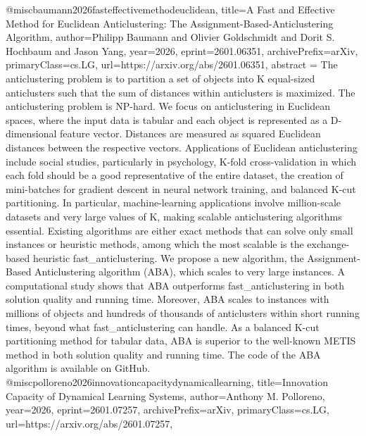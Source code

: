 {}@misc{baumann2026fasteffectivemethodeuclidean,
      title={A Fast and Effective Method for Euclidean Anticlustering: The Assignment-Based-Anticlustering Algorithm}, 
      author={Philipp Baumann and Olivier Goldschmidt and Dorit S. Hochbaum and Jason Yang},
      year={2026},
      eprint={2601.06351},
      archivePrefix={arXiv},
      primaryClass={cs.LG},
      url={https://arxiv.org/abs/2601.06351},
      abstract = {The anticlustering problem is to partition a set of objects into K equal-sized anticlusters such that the sum of distances within anticlusters is maximized. The anticlustering problem is NP-hard. We focus on anticlustering in Euclidean spaces, where the input data is tabular and each object is represented as a D-dimensional feature vector. Distances are measured as squared Euclidean distances between the respective vectors. Applications of Euclidean anticlustering include social studies, particularly in psychology, K-fold cross-validation in which each fold should be a good representative of the entire dataset, the creation of mini-batches for gradient descent in neural network training, and balanced K-cut partitioning. In particular, machine-learning applications involve million-scale datasets and very large values of K, making scalable anticlustering algorithms essential. Existing algorithms are either exact methods that can solve only small instances or heuristic methods, among which the most scalable is the exchange-based heuristic fast_anticlustering. We propose a new algorithm, the Assignment-Based Anticlustering algorithm (ABA), which scales to very large instances. A computational study shows that ABA outperforms fast_anticlustering in both solution quality and running time. Moreover, ABA scales to instances with millions of objects and hundreds of thousands of anticlusters within short running times, beyond what fast_anticlustering can handle. As a balanced K-cut partitioning method for tabular data, ABA is superior to the well-known METIS method in both solution quality and running time. The code of the ABA algorithm is available on GitHub.}
}@misc{polloreno2026innovationcapacitydynamicallearning,
      title={Innovation Capacity of Dynamical Learning Systems}, 
      author={Anthony M. Polloreno},
      year={2026},
      eprint={2601.07257},
      archivePrefix={arXiv},
      primaryClass={cs.LG},
      url={https://arxiv.org/abs/2601.07257},
}
